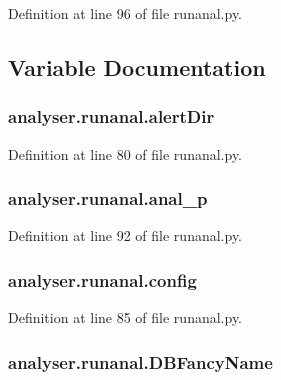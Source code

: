 Definition at line 96 of file runanal.\-py.



\subsection{Variable Documentation}
\hypertarget{namespaceanalyser_1_1runanal_a4fd8a63d8ddd676696968c5d5665516b}{
\subsubsection[{alert\-Dir}]{\setlength{\rightskip}{0pt plus 5cm}analyser.\-runanal.\-alert\-Dir}}\label{namespaceanalyser_1_1runanal_a4fd8a63d8ddd676696968c5d5665516b}


Definition at line 80 of file runanal.\-py.

\hypertarget{namespaceanalyser_1_1runanal_a15dde1b046083c22dd97b40c2b73d996}{
\subsubsection[{anal\-\_\-p}]{\setlength{\rightskip}{0pt plus 5cm}analyser.\-runanal.\-anal\-\_\-p}}\label{namespaceanalyser_1_1runanal_a15dde1b046083c22dd97b40c2b73d996}


Definition at line 92 of file runanal.\-py.

\hypertarget{namespaceanalyser_1_1runanal_ad6f383ab285c12f10972f2a0a1e57d41}{
\subsubsection[{config}]{\setlength{\rightskip}{0pt plus 5cm}analyser.\-runanal.\-config}}\label{namespaceanalyser_1_1runanal_ad6f383ab285c12f10972f2a0a1e57d41}


Definition at line 85 of file runanal.\-py.

\hypertarget{namespaceanalyser_1_1runanal_a678549712dd734c6ee83e26220c84854}{
\subsubsection[{D\-B\-Fancy\-Name}]{\setlength{\rightskip}{0pt plus 5cm}analyser.\-runanal.\-D\-B\-Fancy\-Name}}\label{namespaceanalyser_1_1runanal_a678549712dd734c6ee83e26220c84854}


